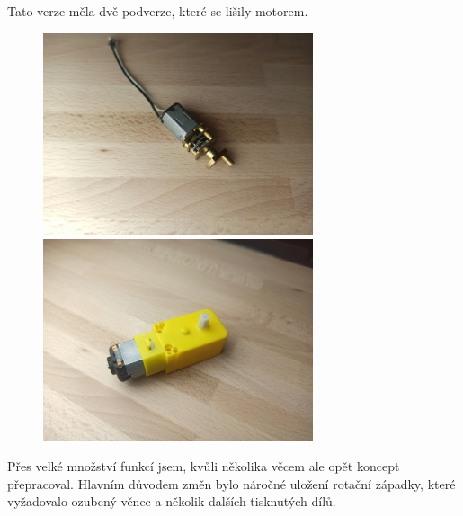 Tato verze měla dvě podverze, které se lišily motorem.
\begin{figure}[htbp]
    \centering
    \includegraphics[width=300]{kapitoly/obrazky/motory/hodinovyStrojek.jpg }
    \includegraphics[width=300]{kapitoly/obrazky/motory/zluty_motor.jpg}
    \label{fig:M1}
\end{figure}

Přes velké množství funkcí jsem, kvůli několika věcem ale opět koncept přepracoval. Hlavním důvodem změn bylo náročné uložení rotační západky, 
které vyžadovalo ozubený věnec a několik dalších tisknutých dílů.

\newpage